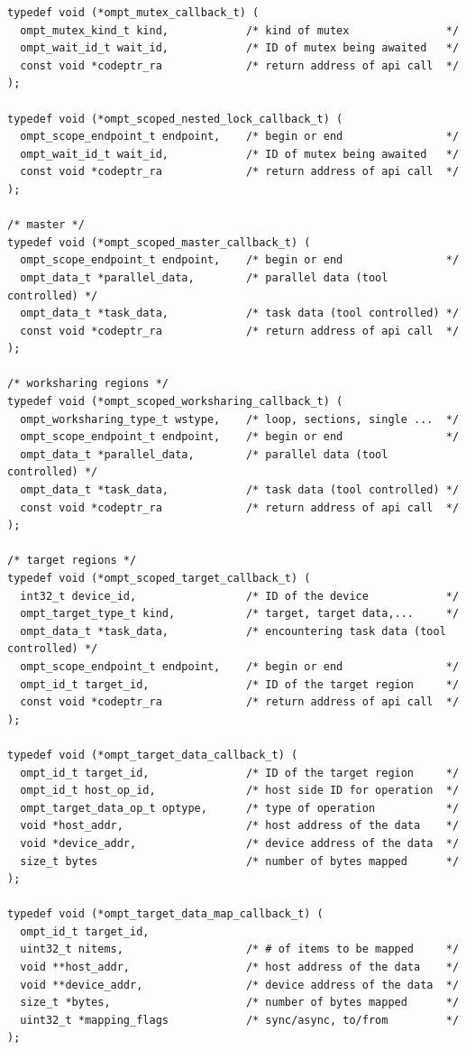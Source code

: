 \documentclass{article}
\begin{document}
\begin{verbatim}
typedef void (*ompt_mutex_callback_t) ( 
  ompt_mutex_kind_t kind,            /* kind of mutex               */ 
  ompt_wait_id_t wait_id,            /* ID of mutex being awaited   */
  const void *codeptr_ra             /* return address of api call  */          
);

typedef void (*ompt_scoped_nested_lock_callback_t) ( 
  ompt_scope_endpoint_t endpoint,    /* begin or end                */ 
  ompt_wait_id_t wait_id,            /* ID of mutex being awaited   */
  const void *codeptr_ra             /* return address of api call  */          
);

/* master */
typedef void (*ompt_scoped_master_callback_t) ( 
  ompt_scope_endpoint_t endpoint,    /* begin or end                */
  ompt_data_t *parallel_data,        /* parallel data (tool controlled) */
  ompt_data_t *task_data,            /* task data (tool controlled) */
  const void *codeptr_ra             /* return address of api call  */
);

/* worksharing regions */
typedef void (*ompt_scoped_worksharing_callback_t) (
  ompt_worksharing_type_t wstype,    /* loop, sections, single ...  */
  ompt_scope_endpoint_t endpoint,    /* begin or end                */
  ompt_data_t *parallel_data,        /* parallel data (tool controlled) */
  ompt_data_t *task_data,            /* task data (tool controlled) */
  const void *codeptr_ra             /* return address of api call  */
);

/* target regions */
typedef void (*ompt_scoped_target_callback_t) ( 
  int32_t device_id,                 /* ID of the device            */
  ompt_target_type_t kind,           /* target, target data,...     */
  ompt_data_t *task_data,            /* encountering task data (tool controlled) */
  ompt_scope_endpoint_t endpoint,    /* begin or end                */ 
  ompt_id_t target_id,               /* ID of the target region     */
  const void *codeptr_ra             /* return address of api call  */
);

typedef void (*ompt_target_data_callback_t) (
  ompt_id_t target_id,               /* ID of the target region     */
  ompt_id_t host_op_id,              /* host side ID for operation  */
  ompt_target_data_op_t optype,      /* type of operation           */
  void *host_addr,                   /* host address of the data    */
  void *device_addr,                 /* device address of the data  */ 
  size_t bytes                       /* number of bytes mapped      */
);

typedef void (*ompt_target_data_map_callback_t) (
  ompt_id_t target_id, 
  uint32_t nitems,                   /* # of items to be mapped     */
  void **host_addr,                  /* host address of the data    */
  void **device_addr,                /* device address of the data  */ 
  size_t *bytes,                     /* number of bytes mapped      */
  uint32_t *mapping_flags            /* sync/async, to/from         */
);


\end{verbatim}
\end{document}
